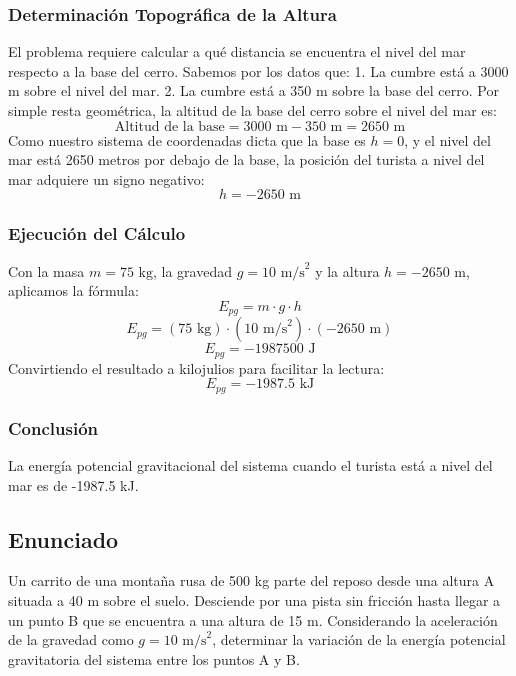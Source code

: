 \documentclass[12pt,a4paper]{article}
\begin{document}
\subsubsection*{Determinación Topográfica de la Altura}
El problema requiere calcular a qué distancia se encuentra el nivel del mar respecto a la base del cerro. 
Sabemos por los datos que:
1. La cumbre está a 3000 m sobre el nivel del mar.
2. La cumbre está a 350 m sobre la base del cerro.
Por simple resta geométrica, la altitud de la base del cerro sobre el nivel del mar es:
$$\text{Altitud de la base} = 3000 \text{ m} - 350 \text{ m} = 2650 \text{ m}$$
Como nuestro sistema de coordenadas dicta que la base es $h = 0$, y el nivel del mar está 2650 metros por debajo de la base, la posición del turista a nivel del mar adquiere un signo negativo:
$$h = -2650 \text{ m}$$

\subsubsection*{Ejecución del Cálculo}
Con la masa $m = 75 \text{ kg}$, la gravedad $g = 10 \text{ m/s}^2$ y la altura $h = -2650 \text{ m}$, aplicamos la fórmula:
$$E_{pg} = m \cdot g \cdot h$$
$$E_{pg} = (75 \text{ kg}) \cdot (10 \text{ m/s}^2) \cdot (-2650 \text{ m})$$
$$E_{pg} = -1987500 \text{ J}$$
Convirtiendo el resultado a kilojulios para facilitar la lectura:
$$E_{pg} = -1987.5 \text{ kJ}$$

\subsubsection*{Conclusión}
La energía potencial gravitacional del sistema cuando el turista está a nivel del mar es de -1987.5 kJ.

\newpage

\subsection*{Enunciado}
Un carrito de una montaña rusa de 500 kg parte del reposo desde una altura A situada a 40 m sobre el suelo. Desciende por una pista sin fricción hasta llegar a un punto B que se encuentra a una altura de 15 m. Considerando la aceleración de la gravedad como $g = 10 \text{ m/s}^2$, determinar la variación de la energía potencial gravitatoria del sistema entre los puntos A y B.
\end{document}
